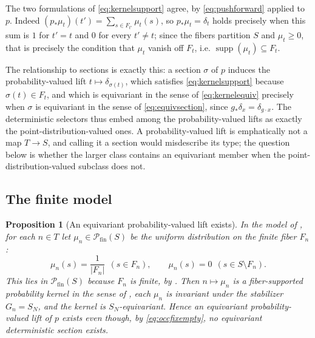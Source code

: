 \documentclass[11pt,reqno]{amsart}
\theoremstyle{plain}
\newtheorem{proposition}[theorem]{Proposition}
\theoremstyle{definition}
\theoremstyle{remark}
\begin{document}
The two formulations of \eqref{eq:kernelsupport} agree, by \eqref{eq:pushforward} applied to $p$. Indeed $(p_{\ast}\mu_{t})(t')=\sum_{s\in F_{t'}}\mu_{t}(s)$, so $p_{\ast}\mu_{t}=\delta_{t}$ holds precisely when this sum is $1$ for $t'=t$ and $0$ for every $t'\neq t$; since the fibers partition $S$ and $\mu_{t}\geq 0$, that is precisely the condition that $\mu_{t}$ vanish off $F_{t}$, i.e. $\operatorname{supp}(\mu_{t})\subseteq F_{t}$.

The relationship to sections is exactly this: a section $\sigma$ of $p$ induces the probability-valued lift $t\mapsto\delta_{\sigma(t)}$, which satisfies \eqref{eq:kernelsupport} because $\sigma(t)\in F_{t}$, and which is equivariant in the sense of \eqref{eq:kernelequiv} precisely when $\sigma$ is equivariant in the sense of \eqref{eq:equivsection}, since $g_{\ast}\delta_{x}=\delta_{g\cdot x}$. The deterministic selectors thus embed among the probability-valued lifts as exactly the point-distribution-valued ones. A probability-valued lift is emphatically not a map $T\to S$, and calling it a section would misdescribe its type; the question below is whether the larger class contains an equivariant member when the point-distribution-valued subclass does not.

\subsection{The finite model}

\begin{proposition}[An equivariant probability-valued lift exists]
\label{prop:ensemble}
In the model of , for each $n\in T$ let $\mu_{n}\in\mathcal{P}_{\mathrm{fin}}(S)$ be the uniform distribution on the finite fiber $F_{n}$:
\begin{equation}
\label{eq:uniform}
\mu_{n}(s)=\frac{1}{|F_{n}|}\ \ (s\in F_{n}),
\qquad
\mu_{n}(s)=0\ \ (s\in S\setminus F_{n}).
\end{equation}
This lies in $\mathcal{P}_{\mathrm{fin}}(S)$ because $F_{n}$ is finite, by . Then $n\mapsto\mu_{n}$ is a fiber-supported probability kernel in the sense of , each $\mu_{n}$ is invariant under the stabilizer $G_{n}=S_{N}$, and the kernel is $S_{N}$-equivariant. Hence an equivariant probability-valued lift of $p$ exists even though, by \eqref{eq:occfixempty}, no equivariant deterministic section exists.
\end{proposition}
\end{document}
